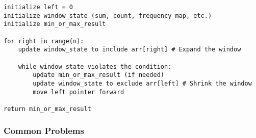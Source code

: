 \begin{algo}
\begin{lstlisting}
initialize left = 0
initialize window_state (sum, count, frequency map, etc.)
initialize min_or_max_result

for right in range(n):
    update window_state to include arr[right] # Expand the window

    while window_state violates the condition:
        update min_or_max_result (if needed)
        update window_state to exclude arr[left] # Shrink the window
        move left pointer forward

return min_or_max_result
\end{lstlisting}
\end{algo}
\newpage

\subsubsection{Common Problems}
